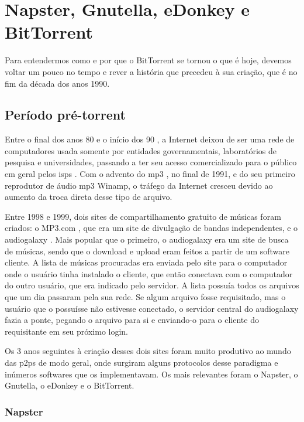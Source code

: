 
\chapter{Napster, Gnutella, eDonkey e BitTorrent}

Para entendermos como e por que o BitTorrent se tornou o que é hoje, devemos voltar um
pouco no tempo e rever a história que precedeu à sua criação, que é no fim da década dos
anos 1990.

\section{Período pré-torrent}

Entre o final dos anos 80 e o início dos 90 \cite{wiki:fs,wiki:fs-timeline}, a
Internet deixou de ser uma rede de computadores usada somente por entidades
governamentais, laboratórios de pesquisa e universidades, passando a ter seu acesso
comercializado para o público em geral pelos \glspl{isp} \cite{wiki:isp}. Com o
advento do \gls{mp3} \cite{wiki:mp3}, no final de 1991, e do seu primeiro reprodutor
de áudio \gls*{mp3} Winamp, o tráfego da Internet cresceu devido ao aumento da troca
direta desse tipo de arquivo.

Entre 1998 e 1999, dois sites de compartilhamento gratuito de músicas foram criados: o
MP3.com \cite{wiki:mp3.com}, que era um site de divulgação de bandas independentes,
e o \gls{audiogalaxy} \cite{wiki:audiogalaxy.com,revista:pnp}. Mais popular que o
primeiro, o \gls*{audiogalaxy} era um site de busca de músicas, sendo que o download e
upload eram feitos a partir de um software cliente. A lista de músicas procuradas era
enviada pelo site para o computador onde o usuário tinha instalado o cliente, que então
conectava com o computador do outro usuário, que era indicado pelo servidor. A lista
possuía todos os arquivos que um dia passaram pela sua rede. Se algum arquivo fosse
requisitado, mas o usuário que o possuísse não estivesse conectado, o servidor central
do \gls*{audiogalaxy} fazia a ponte, pegando o arquivo para si e enviando-o para o
cliente do requisitante em seu próximo login.

Os 3 anos seguintes à criação desses dois sites foram muito produtivo ao mundo das
\glspl{p2p} de modo geral, onde surgiram alguns protocolos desse paradigma e inúmeros
softwares que os implementavam. Os mais relevantes foram o Napster, o Gnutella, o
eDonkey e o BitTorrent.

\subsection*{Napster}

